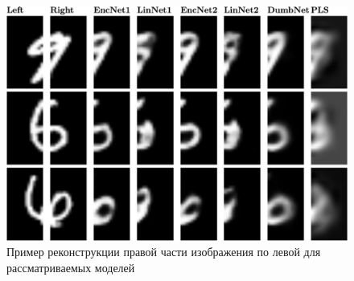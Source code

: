\begin{figure}[!tp]
\centering \includegraphics[width=\linewidth]{figs/ch2/mnist_preds}
\caption{Пример реконструкции правой части изображения по левой для рассматриваемых моделей}
\label{fgr:2}
\end{figure}
